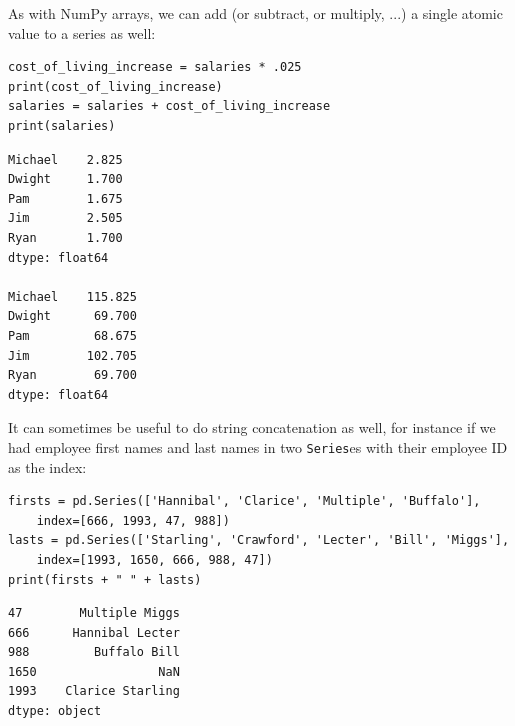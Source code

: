 As with NumPy arrays, we can add (or subtract, or multiply, ...) a single
atomic value to a series as well:

\begin{Verbatim}[fontsize=\small,samepage=true,frame=single,framesep=3mm]
cost_of_living_increase = salaries * .025
print(cost_of_living_increase)
salaries = salaries + cost_of_living_increase
print(salaries)
\end{Verbatim}

\begin{Verbatim}[fontsize=\small,samepage=true,frame=leftline,framesep=5mm,framerule=1mm]
Michael    2.825
Dwight     1.700
Pam        1.675
Jim        2.505
Ryan       1.700
dtype: float64

Michael    115.825
Dwight      69.700
Pam         68.675
Jim        102.705
Ryan        69.700
dtype: float64
\end{Verbatim}

It can sometimes be useful to do string concatenation as well, for instance if
we had employee first names and last names in two \texttt{Series}es with their
employee ID as the index:

\begin{Verbatim}[fontsize=\small,samepage=true,frame=single,framesep=3mm]
firsts = pd.Series(['Hannibal', 'Clarice', 'Multiple', 'Buffalo'],
    index=[666, 1993, 47, 988])
lasts = pd.Series(['Starling', 'Crawford', 'Lecter', 'Bill', 'Miggs'],
    index=[1993, 1650, 666, 988, 47])
print(firsts + " " + lasts)
\end{Verbatim}

\begin{Verbatim}[fontsize=\small,samepage=true,frame=leftline,framesep=5mm,framerule=1mm]
47        Multiple Miggs
666      Hannibal Lecter
988         Buffalo Bill
1650                 NaN
1993    Clarice Starling
dtype: object
\end{Verbatim}

